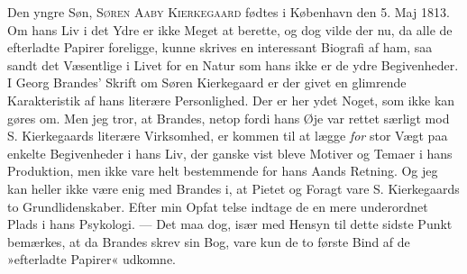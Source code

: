 \documentclass[12pt,a4paper,openany]{book}
\newcommand{\opage}[1]{\marginnote{\footnotesize\textit{[#1]}}}
\begin{document}
Den yngre Søn, \textsc{Søren Aaby Kierkegaard} fødtes i
København den 5. Maj 1813. Om hans Liv i det Ydre
er ikke Meget at berette, og dog vilde der nu, da alle
de efterladte Papirer foreligge, kunne skrives en interessant
Biografi af ham, saa sandt det Væsentlige i Livet
for en Natur som hans ikke er de ydre Begivenheder.
I Georg Brandes' Skrift om Søren Kierkegaard er der
givet en glimrende Karakteristik af hans literære Personlighed.
Der er her ydet Noget, som ikke kan gøres om.
Men jeg tror, at Brandes, netop fordi hans Øje var
rettet særligt mod S. Kierkegaards literære Virksomhed,
er kommen til at lægge \textit{for} stor Vægt paa enkelte Begivenheder
i hans Liv, der ganske vist bleve Motiver og
Temaer i hans Produktion, men ikke vare helt bestemmende
for hans Aands Retning. Og jeg kan heller ikke
være enig med Brandes i, at Pietet og Foragt vare
S. Kierkegaards to Grundlidenskaber. Efter min Opfat%
\opage{31}telse indtage de en mere underordnet Plads i hans
Psykologi. --- Det maa dog, især med Hensyn til dette
sidste Punkt bemærkes, at da Brandes skrev sin Bog,
vare kun de to første Bind af de »efterladte Papirer«
udkomne.
\end{document}
